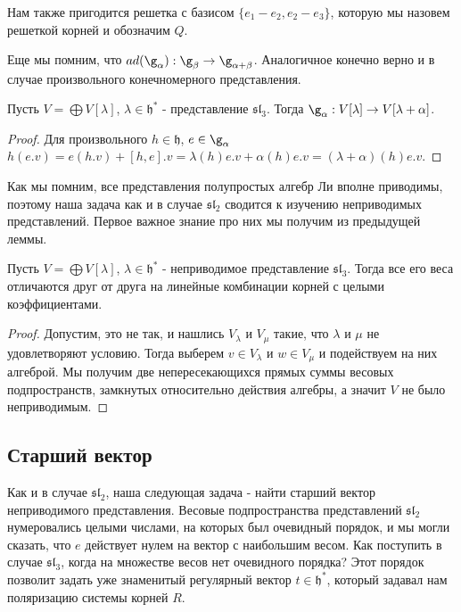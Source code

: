 \documentclass[a4article]{article}
\begin{document}
Нам также пригодится решетка с базисом $\{e_1-e_2, e_2-e_3\}$, которую мы назовем решеткой корней и обозначим $Q$.

Еще мы помним, что $ad(\g_{\alpha}):\g_{\beta} \rightarrow \g_{\alpha+\beta}$. Аналогичное конечно верно и в случае произвольного конечномерного представления.
\begin{lemma}
    Пусть $V = \bigoplus V[\lambda]$, $\lambda \in \mathfrak{h}^*$ - представление $\mathfrak{sl}_3$. Тогда $\g_{\alpha}: V[\lambda] \rightarrow V[\lambda + \alpha]$.
\end{lemma}
\begin{proof}
    Для произвольного $h \in \mathfrak{h}$, $e \in \g_{\alpha}$ $h(e.v)=e(h.v)+[h,e].v = \lambda(h)e.v+\alpha(h)e.v = (\lambda+\alpha)(h)e.v$.
\end{proof}

Как мы помним, все представления полупростых алгебр Ли вполне приводимы, поэтому наша задача как и в случае $\mathfrak{sl}_2$ сводится к изучению неприводимых представлений. Первое важное знание про них мы получим из предыдущей леммы.

\begin{corollary}
    Пусть $V = \bigoplus V[\lambda]$, $\lambda \in \mathfrak{h}^*$ - неприводимое представление $\mathfrak{sl}_3$. Тогда все его веса отличаются друг от друга на линейные комбинации корней с целыми коэффициентами.
\end{corollary}
\begin{proof}
    Допустим, это не так, и нашлись $V_{\lambda}$ и $V_{\mu}$ такие, что $\lambda$ и $\mu$ не удовлетворяют условию. Тогда выберем $v \in V_{\lambda}$ и $w \in V_{\mu}$ и подействуем на них алгеброй. Мы получим две непересекающихся прямых суммы весовых подпространств, замкнутых относительно действия алгебры, а значит $V$ не было неприводимым.
\end{proof}
\subsection*{Старший вектор}

Как и в случае $\mathfrak{sl}_2$, наша следующая задача - найти старший вектор неприводимого представления. Весовые подпространства представлений $\mathfrak{sl}_2$ нумеровались целыми числами, на которых был очевидный порядок, и мы могли сказать, что $e$ действует нулем на вектор с наибольшим весом. Как поступить в случае $\mathfrak{sl}_3$, когда на множестве весов нет очевидного порядка? Этот порядок позволит задать уже знаменитый регулярный вектор $t \in \mathfrak{h}^*$, который задавал нам поляризацию системы корней $R$.
\end{document}
